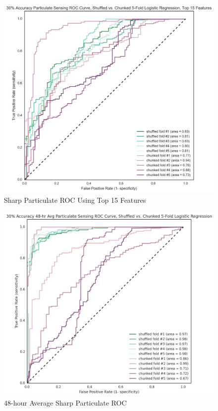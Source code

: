 \begin{figure}[htb]
 	\includegraphics[width=\textwidth]{figs/sharp_goals_30_roc_pruned_features}               
 	 \caption{Sharp Particulate ROC Using Top 15 Features}
  	\label{fig:sharp_30_roc_pruned_features}
\end{figure}


\begin{figure}[htb]
 	\includegraphics[width=\textwidth]{figs/sharp_48_avg_goals_30_roc}               
 	 \caption{48-hour Average Sharp Particulate ROC}
  	\label{fig:sharp_48_avg_goals_30_roc}
\end{figure}

